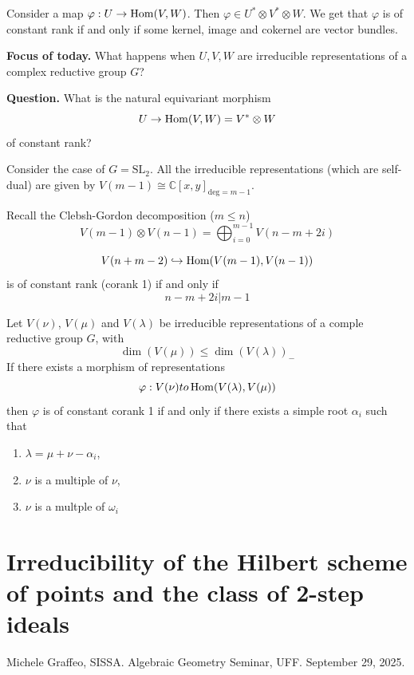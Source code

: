 \medskip\noindent
Consider a map $\varphi: U \to \mathop{\mathrm{Hom}}\nolimits(V,W)$.
Then $\varphi \in U^* \otimes  V^* \otimes
W$.
We get that
$\varphi$ is of constant rank if and only if
some kernel, image and cokernel are vector
bundles.

\medskip\noindent
{\bf Focus of today.} What happens when
$U,V,W$ are irreducible
representations of a complex reductive group
$G$?

\medskip\noindent
{\bf Question.} What is the natural
equivariant morphism
$$
U \to \mathop{\mathrm{Hom}}\nolimits(V,W)=V^* \otimes  W
$$
of constant rank?

\medskip\noindent
Consider the case of $G=\text{SL}_2$. All the
irreducible representations (which are
self-dual) are given by
$V(m-1)\cong
\mathbb{C}[x,y]_{\text{deg}=m-1}$.

Recall the Clebsh-Gordon decomposition ($m
\leq  n$)
$$
V(m-1)\otimes
V(n-1)=\bigoplus_{i=0}^{m-1}V(n-m+2i)
$$

\begin{theorem}
\label{theorem-BFL22}
$$
V(n+m-2)\hookrightarrow \mathop{\mathrm{Hom}}\nolimits(V(m-1),V(n-1))
$$
is of constant rank (corank 1) if and only if
$$
n-m+2i|m-1
$$
\end{theorem}

\begin{theorem}
\label{theorem-BFF25}
Let $V(\nu)$, $V(\mu)$ and $V(\lambda)$ be
irreducible representations
of a comple reductive group $G$, with
$$
\dim(V(\mu)) \leq \dim(V(\lambda))_-
$$
If there exists a morphism of representations
$$
\varphi: V (\nu) to \mathop{\mathrm{Hom}}\nolimits (V (\lambda),V(\mu))
$$
then $\varphi$ is of constant corank 1 if and
only if
there exists a simple root $\alpha_i$ such
that
\begin{enumerate}
\item $\lambda=\mu+\nu-\alpha_i$,
\item $\nu$ is a multiple of $\nu$,
\item  $\nu$ is a multple of $\omega_i$
\end{enumerate}
\end{theorem}

\section{Irreducibility of the Hilbert scheme
of points and the class of 2-step
ideals}
\label{section-irred-hilbe-schem-point}

\noindent
Michele Graffeo, SISSA.
Algebraic Geometry Seminar, UFF.
September 29, 2025.

